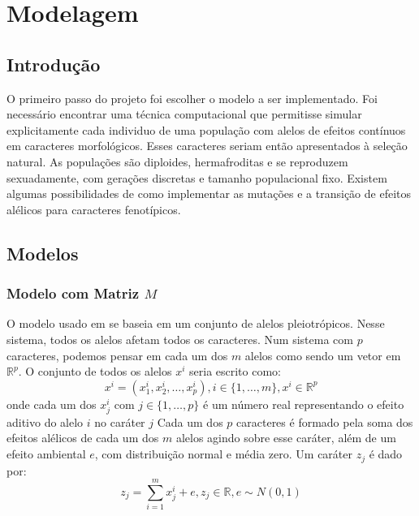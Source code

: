 \pagestyle{empty}
\cleardoublepage
\pagestyle{fancy}
\chapter{Modelagem}\label{cap2}

\section{Introdução}\label{cap2:intro}

O primeiro passo do projeto foi escolher o modelo a ser implementado.
Foi necessário encontrar uma técnica computacional que permitisse
simular explicitamente cada individuo de uma população com alelos de efeitos
contínuos em caracteres morfológicos.
Esses caracteres seriam então apresentados à seleção natural.
As populações são diploides, hermafroditas e se reproduzem sexuadamente,
com gerações discretas e tamanho populacional fixo.
Existem algumas possibilidades de como implementar as mutações e
a transição de efeitos alélicos para caracteres fenotípicos.

\section{Modelos}\label{cap2:mem}

\subsection{Modelo com Matriz $M$}\label{cap2:mem:ModelM}

O modelo usado em \cite{Jones2003, Jones2004, Jones2007} se baseia em um
conjunto de alelos pleiotrópicos.
Nesse sistema, todos os alelos afetam todos os caracteres.
Num sistema com $p$ caracteres, podemos pensar em cada um
dos $m$ alelos como sendo um vetor em $\mathbb{R}^p$.
O conjunto de todos os alelos $x^i$ seria escrito como:
\begin{equation}
x^i = ( x^i_1, x^i_2,\ldots, x^i_p), i \in \{1,\ldots, m\}, x^i \in \mathbb{R}^p
\end{equation}
onde cada um dos $x^i_j$ com $j \in \{1,\ldots, p\}$ é um número real
representando o efeito aditivo do alelo $i$ no caráter $j$
Cada um dos
$p$ caracteres é formado pela soma dos efeitos alélicos de cada um dos
$m$ alelos agindo sobre esse caráter, além de um efeito ambiental $e$, com
distribuição normal e média zero.
Um caráter $z_j$ é dado
por:
\begin{equation}
z_j = \sum_{i=1}^m x^i_j + e, z_j \in \mathbb{R}, e \sim N(0, 1)
\end{equation}


